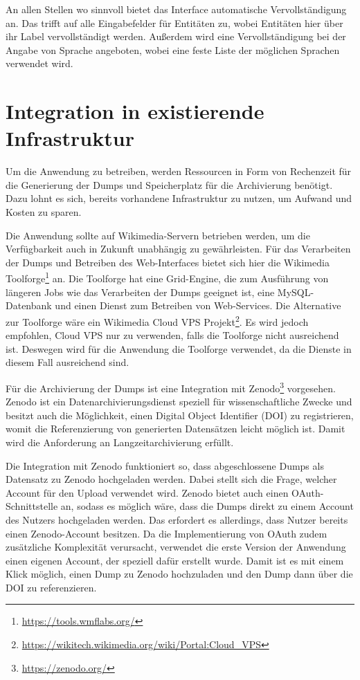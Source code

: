 An allen Stellen wo sinnvoll bietet das Interface automatische Vervollständigung an.
Das trifft auf alle Eingabefelder für Entitäten zu, wobei Entitäten hier über ihr Label vervollständigt werden.
Außerdem wird eine Vervollständigung bei der Angabe von Sprache angeboten, wobei eine feste Liste der möglichen Sprachen verwendet wird.

\section{Integration in existierende Infrastruktur}
Um die Anwendung zu betreiben, werden Ressourcen in Form von Rechenzeit für die Generierung der Dumps und Speicherplatz für die Archivierung benötigt.
Dazu lohnt es sich, bereits vorhandene Infrastruktur zu nutzen, um Aufwand und Kosten zu sparen.

Die Anwendung sollte auf Wikimedia-Servern betrieben werden, um die Verfügbarkeit auch in Zukunft unabhängig zu gewährleisten.
Für das Verarbeiten der Dumps und Betreiben des Web-Interfaces bietet sich hier die Wikimedia Toolforge\footnote{\url{https://tools.wmflabs.org/}} an.
Die Toolforge hat eine Grid-Engine, die zum Ausführung von längeren Jobs wie das Verarbeiten der Dumps geeignet ist, eine MySQL-Datenbank und einen Dienst zum Betreiben von Web-Services.
Die Alternative zur Toolforge wäre ein Wikimedia Cloud VPS Projekt\footnote{\url{https://wikitech.wikimedia.org/wiki/Portal:Cloud_VPS}}.
Es wird jedoch empfohlen, Cloud VPS nur zu verwenden, falls die Toolforge nicht ausreichend ist.
Deswegen wird für die Anwendung die Toolforge verwendet, da die Dienste in diesem Fall ausreichend sind.

Für die Archivierung der Dumps ist eine Integration mit Zenodo\footnote{\url{https://zenodo.org/}} vorgesehen.
Zenodo ist ein Datenarchivierungsdienst speziell für wissenschaftliche Zwecke und besitzt auch die Möglichkeit, einen Digital Object Identifier (DOI) zu registrieren, womit die Referenzierung von generierten Datensätzen leicht möglich ist.
Damit wird die Anforderung an Langzeitarchivierung erfüllt. 

Die Integration mit Zenodo funktioniert so, dass abgeschlossene Dumps als Datensatz zu Zenodo hochgeladen werden.
Dabei stellt sich die Frage, welcher Account für den Upload verwendet wird.
Zenodo bietet auch einen OAuth-Schnittstelle an, sodass es möglich wäre, dass die Dumps direkt zu einem Account des Nutzers hochgeladen werden. 
Das erfordert es allerdings, dass Nutzer bereits einen Zenodo-Account besitzen.
Da die Implementierung von OAuth zudem zusätzliche Komplexität verursacht, verwendet die erste Version der Anwendung einen eigenen Account, der speziell dafür erstellt wurde.
Damit ist es mit einem Klick möglich, einen Dump zu Zenodo hochzuladen und den Dump dann über die DOI zu referenzieren.